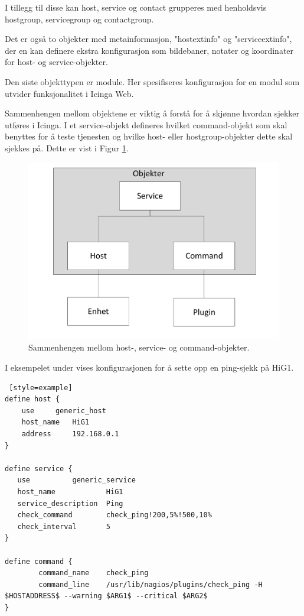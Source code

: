 I tillegg til disse kan host, service og contact grupperes med henholdsvis hostgroup, servicegroup og contactgroup.

Det er også to objekter med metainformasjon, "hostextinfo" og "serviceextinfo", der en kan definere ekstra konfigurasjon som bildebaner, notater og koordinater for host- og service-objekter.

Den siste objekttypen er module. Her spesifiseres konfigurasjon for en modul som utvider funksjonalitet i Icinga Web.

Sammenhengen mellom objektene er viktig å forstå for å skjønne hvordan sjekker utføres i Icinga. I et service-objekt defineres hvilket command-objekt som skal benyttes for å teste tjenesten og hvilke host- eller hostgroup-objekter dette skal sjekkes på. Dette er vist i Figur \ref{command_host_service}.

\begin{figure}[H]
    \centering
    \includegraphics[scale=0.4]{img/command_host_service}
    \caption{Sammenhengen mellom host-, service- og command-objekter.}
    \label{command_host_service}
\end{figure}
I eksempelet under vises konfigurasjonen for å sette opp en ping-sjekk på HiG1.
\begin{lstlisting} [style=example]
define host {
    use 	generic_host
    host_name	HiG1
    address   	192.168.0.1
}

define service {
   use			generic_service
   host_name            HiG1
   service_description  Ping
   check_command        check_ping!200,5%!500,10%
   check_interval       5
}

define command {
        command_name    check_ping
        command_line    /usr/lib/nagios/plugins/check_ping -H $HOSTADDRESS$ --warning $ARG1$ --critical $ARG2$   
}
\end{lstlisting}
